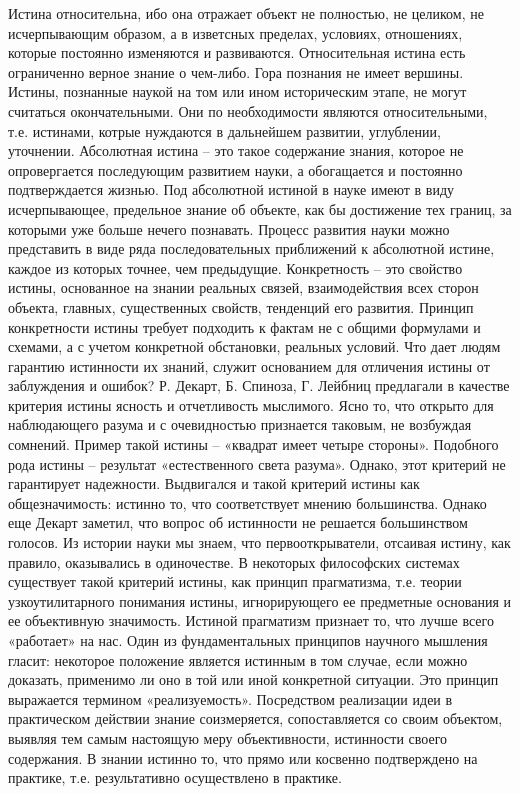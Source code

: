 \documentclass[12pt]{article}
\begin{document}
Истина относительна, ибо она отражает объект не полностью, не целиком, не исчерпывающим образом, а в
изветсных  пределах,  условиях, отношениях,  которые  постоянно  изменяются  и  развиваются.  Относительная
истина есть ограниченно верное знание о чем-либо. Гора познания не имеет вершины. Истины, познанные
наукой на том или ином историческим этапе, не могут считаться окончательными. Они по необходимости
являются относительными, т.е. истинами, котрые нуждаются в дальнейшем развитии, углублении, уточнении.
Абсолютная истина – это такое содержание знания, которое не опровергается последующим развитием науки, а
обогащается  и  постоянно  подтверждается  жизнью. Под  абсолютной  истиной  в  науке  имеют  в  виду
исчерпывающее, предельное знание об объекте, как бы достижение тех границ, за которыми уже больше нечего
познавать.  Процесс  развития  науки  можно  представить  в  виде  ряда  последовательных  приближений  к
абсолютной истине, каждое из которых точнее, чем предыдущие.
Конкретность – это свойство истины, основанное на знании реальных связей, взаимодействия всех сторон
объекта,  главных,  существенных  свойств,  тенденций  его  развития.  Принцип  конкретности  истины  требует
подходить к фактам не с общими формулами и схемами, а с учетом конкретной обстановки, реальных условий.
Что дает людям гарантию истинности их знаний, служит основанием для отличения истины от заблуждения и
ошибок?
Р. Декарт, Б. Спиноза, Г. Лейбниц предлагали в качестве критерия истины ясность и отчетливость мыслимого.
Ясно то, что открыто для наблюдающего разума и с очевидностью признается таковым, не возбуждая сомнений.
Пример такой истины – «квадрат имеет четыре стороны». Подобного рода истины – результат «естественного
света разума». Однако, этот критерий не гарантирует надежности.
Выдвигался  и  такой  критерий  истины  как  общезначимость:  истинно  то,  что  соответствует  мнению
большинства. Однако еще Декарт заметил, что вопрос об истинности не решается большинством голосов. Из
истории науки мы знаем, что первооткрыватели, отсаивая истину, как правило, оказывались в одиночестве.
В некоторых философских системах существует такой критерий истины, как принцип прагматизма, т.е. теории
узкоутилитарного понимания истины, игнорирующего ее предметные основания и ее объективную значимость.
Истиной прагматизм признает то, что лучше всего «работает» на нас.
Один из фундаментальных принципов научного мышления гласит: некоторое положение является истинным в
том случае, если  можно  доказать, применимо ли оно в той или  иной  конкретной ситуации. Это принцип
выражается  термином  «реализуемость».  Посредством  реализации  идеи  в  практическом  действии  знание
соизмеряется,  сопоставляется  со  своим  объектом,  выявляя  тем  самым  настоящую  меру  объективности,
истинности своего содержания. В знании истинно то, что прямо или косвенно подтверждено на практике, т.е.
результативно осуществлено в практике.
\end{document}
